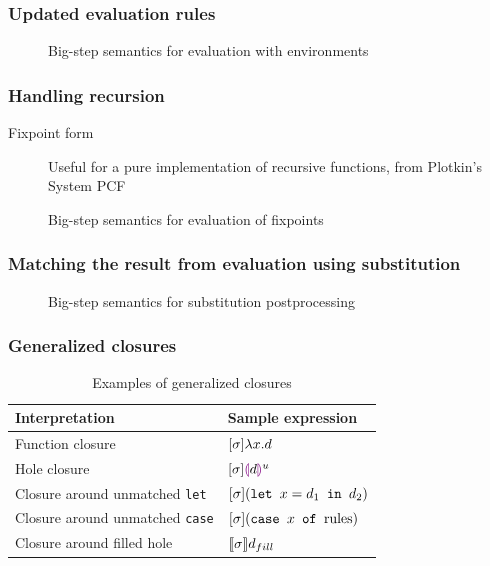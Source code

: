 \documentclass{beamer}
\begin{document}
\begin{frame}
  \frametitle{Updated evaluation rules}


  \begin{figure}
    \footnotesize
    \centering
    
    \caption{Big-step semantics for evaluation with environments}
    \label{fig:eval-env-rules}
  \end{figure}
\end{frame}

\begin{frame}
  \frametitle{Handling recursion}

  \begin{description}
  \item[Fixpoint form] Useful for a pure implementation of recursive functions, from Plotkin's System PCF
  \end{description}
  
  \begin{figure}
    \footnotesize
    \centering
    
    \caption{Big-step semantics for evaluation of fixpoints}
    \label{fig:fixpoint-rules}
  \end{figure}
\end{frame}

\begin{frame}
  \frametitle{Matching the result from evaluation using substitution}

  \begin{figure}
    \centering
    \footnotesize
    \renewcommand{\judgboxfontsize}{\footnotesize}
    
    \caption{Big-step semantics for substitution postprocessing}
    \label{fig:pplc-rules}
  \end{figure}
\end{frame}

\begin{frame}
  \frametitle{Generalized closures}

  \begin{table}
    \centering
    \begin{tabular}{l|l}
      \hline
      Interpretation & Sample expression \\
      \hline\hline
      Function closure & $[\sigma]\lambda x.d$ \\
      Hole closure & $[\sigma]\textcolor{violet}{\llparenthesis} d\textcolor{violet}{\rrparenthesis}^u$ \\
      Closure around unmatched \texttt{let} & $[\sigma](\texttt{let }x=d_1\texttt{ in }d_2)$ \\
      Closure around unmatched \texttt{case} & $[\sigma](\texttt{case }x\texttt{ of }\text{rules})$ \\
      Closure around filled hole & $\llbracket\sigma\rrbracket d_{fill}$ \\
      \hline\hline
    \end{tabular}
    \caption{Examples of generalized closures}
    \label{tab:generaized-closures-examples}
  \end{table}

\end{frame}
\end{document}
